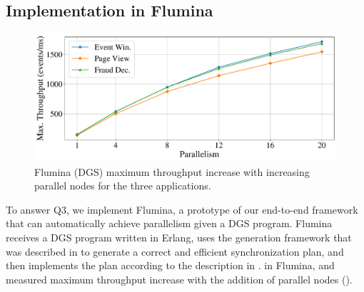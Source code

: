 \subsection{Implementation in Flumina}
\label{dgs:ssec:eval-prototype-performance}

\begin{figure}[t]
  \centering
  \includegraphics[width=0.8\columnwidth]{figures/dgs/flumina_max_throughput_scaleup.pdf}

  \caption[Flumina (DGS) throughput experiment.]{Flumina (DGS) maximum throughput increase with increasing parallel nodes for the three applications.
  }
  \label{dgs:fig:flumina-scaling}
\end{figure}

To answer Q3, we implement Flumina,
a prototype of our end-to-end framework that can automatically achieve parallelism given a DGS program.
Flumina receives a DGS program written in Erlang,
uses the generation framework that was described in  to generate a correct and efficient synchronization plan,
and then implements the plan according to the description in .
in Flumina, and measured maximum throughput increase with the addition of parallel nodes
().

